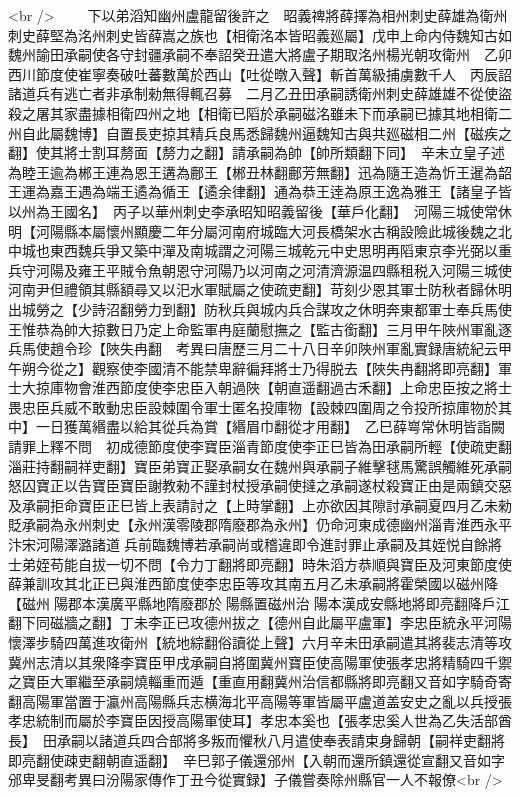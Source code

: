 <br />
　　下以弟滔知幽州盧龍留後許之　昭義禆將薛擇為相州刺史薛雄為衛州刺史薛堅為洺州刺史皆薛嵩之族也【相衛洺本皆昭義廵屬】戊申上命内侍魏知古如魏州諭田承嗣使各守封疆承嗣不奉詔癸丑遣大將盧子期取洺州楊光朝攻衛州　乙卯西川節度使崔寧奏破吐蕃數萬於西山【吐從暾入聲】斬首萬級捕虜數千人　丙辰詔諸道兵有逃亡者非承制勑無得輒召募　二月乙丑田承嗣誘衛州刺史薛雄雄不從使盜殺之屠其家盡據相衛四州之地【相衛已䧟於承嗣磁洺雖未下而承嗣已據其地相衛二州自此屬魏博】自置長吏掠其精兵良馬悉歸魏州逼魏知古與共廵磁相二州【磁疾之翻】使其將士割耳剺面【剺力之翻】請承嗣為帥【帥所類翻下同】　辛未立皇子述為睦王逾為郴王連為恩王遘為鄜王【郴丑林翻鄜芳無翻】迅為隨王造為忻王暹為韶王運為嘉王遇為端王遹為循王【遹余律翻】通為恭王逹為原王逸為雅王【諸皇子皆以州為王國名】　丙子以華州刺史李承昭知昭義留後【華戶化翻】　河陽三城使常休明【河陽縣本屬懷州顯慶二年分屬河南府城臨大河長橋架水古稱設險此城後魏之北中城也東西魏兵爭又築中潬及南城謂之河陽三城乾元中史思明再䧟東京李光弼以重兵守河陽及雍王平賊令魚朝恩守河陽乃以河南之河清濟源温四縣租税入河陽三城使河南尹但禮領其縣額尋又以汜水軍賦屬之使疏吏翻】苛刻少恩其軍士防秋者歸休明出城勞之【少詩沼翻勞力到翻】防秋兵與城内兵合謀攻之休明奔東都軍士奉兵馬使王惟恭為帥大掠數日乃定上命監軍冉庭蘭慰撫之【監古銜翻】三月甲午陜州軍亂逐兵馬使趙令珍【陜失冉翻　考異曰唐歷三月二十八日辛卯陜州軍亂實録唐統紀云甲午朔今從之】觀察使李國清不能禁卑辭徧拜將士乃得脱去【陜失冉翻將即亮翻】軍士大掠庫物會淮西節度使李忠臣入朝過陜【朝直遥翻過古禾翻】上命忠臣按之將士畏忠臣兵威不敢動忠臣設棘圍令軍士匿名投庫物【設棘四圍周之令投所掠庫物於其中】一日獲萬緡盡以給其從兵為賞【緡眉巾翻從才用翻】　乙巳薛㟧常休明皆詣闕請罪上釋不問　初成德節度使李寶臣淄青節度使李正巳皆為田承嗣所輕【使疏吏翻淄莊持翻嗣祥吏翻】寶臣弟寶正娶承嗣女在魏州與承嗣子維擊毬馬驚誤觸維死承嗣怒囚寶正以告寶臣寶臣謝教勑不謹封杖授承嗣使撻之承嗣遂杖殺寶正由是兩鎮交惡及承嗣拒命寶臣正巳皆上表請討之【上時掌翻】上亦欲因其隙討承嗣夏四月乙未勑貶承嗣為永州刺史【永州漢零陵郡隋廢郡為永州】仍命河東成德幽州淄青淮西永平汴宋河陽澤潞諸道兵前臨魏博若承嗣尚或稽違即令進討罪止承嗣及其姪悦自餘將士弟姪苟能自拔一切不問【令力丁翻將即亮翻】時朱滔方恭順與寶臣及河東節度使薛兼訓攻其北正已與淮西節度使李忠臣等攻其南五月乙未承嗣將霍榮國以磁州降【磁州陽郡本漢廣平縣地隋廢郡於陽縣置磁州治陽本漢成安縣地將即亮翻降戶江翻下同磁牆之翻】丁未李正已攻德州拔之【德州自此屬平盧軍】李忠臣統永平河陽懷澤步騎四萬進攻衛州【統地綜翻俗讀從上聲】六月辛未田承嗣遣其將裴志清等攻冀州志清以其衆降李寶臣甲戌承嗣自將圍冀州寶臣使高陽軍使張孝忠將精騎四千禦之寶臣大軍繼至承嗣燒輜重而遁【重直用翻冀州治信都縣將即亮翻又音如字騎奇寄翻高陽軍當置于瀛州高陽縣兵志横海北平高陽等軍皆屬平盧道盖安史之亂以兵授張孝忠統制而屬於李寶臣因授高陽軍使耳】孝忠本奚也【張孝忠奚人世為乙失活部酋長】　田承嗣以諸道兵四合部將多叛而懼秋八月遣使奉表請束身歸朝【嗣祥吏翻將即亮翻使疎吏翻朝直遥翻】　辛巳郭子儀還邠州【入朝而還所鎮還從宣翻又音如字邠卑旻翻考異曰汾陽家傳作丁丑今從實録】子儀嘗奏除州縣官一人不報僚<br />
